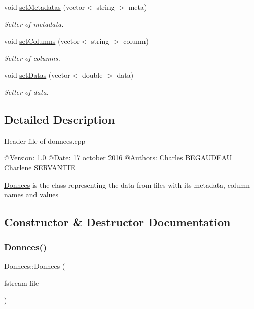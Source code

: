 \begin{DoxyCompactItemize}
void \hyperlink{classDonnees_aaea7bb6bb8f2b88645847429d71ba3f6}{set\+Metadatas} (vector$<$ string $>$ meta)
\begin{DoxyCompactList}\small\item\em Setter of metadata. \end{DoxyCompactList}\item 
void \hyperlink{classDonnees_a5b8c1acea8365a6a28336170020b4ce2}{set\+Columns} (vector$<$ string $>$ column)
\begin{DoxyCompactList}\small\item\em Setter of columns. \end{DoxyCompactList}\item 
void \hyperlink{classDonnees_a1887d61042d17e57978cbd85da118502}{set\+Datas} (vector$<$ double $>$ data)
\begin{DoxyCompactList}\small\item\em Setter of data. \end{DoxyCompactList}\end{DoxyCompactItemize}


\subsection{Detailed Description}
Header file of donnees.\+cpp \begin{DoxyVerb}@Version: 1.0
@Date:    17 october 2016
@Authors: Charles BEGAUDEAU Charlene SERVANTIE\end{DoxyVerb}


\hyperlink{classDonnees}{Donnees} is the class representing the data from files with its metadata, column names and values 

\subsection{Constructor \& Destructor Documentation}
\hypertarget{classDonnees_a29a0763f255154038b260dccb7b024d5}{}\label{classDonnees_a29a0763f255154038b260dccb7b024d5} 
\subsubsection{\texorpdfstring{Donnees()}{Donnees()}}
{\footnotesize\ttfamily Donnees\+::\+Donnees (\begin{DoxyParamCaption}\item[{fstream}]{file }\end{DoxyParamCaption})}



